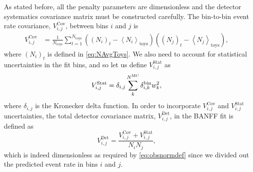 As stated before, all the penalty parameters are dimensionless and
the detector systematics covariance matrix must be constructed carefully.
The bin-to-bin event rate covariance, $V_{i,j}^{\text{Cov}}$, between
bins $i$ and $j$ is
\begin{equation}
\begin{aligned}V_{i,j}^{\text{Cov}} & =\frac{1}{N_{\text{toys}}}\sum_{t=1}^{N_{\text{toys}}}\left(\left(N_{i}\right)_{t}-\left\langle N_{i}\right\rangle _{\text{toys}}\right)\left(\left(N_{j}\right)_{t}-\left\langle N_{j}\right\rangle _{\text{toys}}\right),\end{aligned}
\label{eq:detector-cov-terms}
\end{equation}
where $\left(N_{i}\right)_{t}$ is defined in \eqref{eq:NAvgToys}.
We also need to account for statistical uncertainties in the fit bins,
and so let us define $V_{i,j}^{\text{Stat}}$ as
\begin{equation}
V_{i,j}^{\text{Stat}}=\text{\ensuremath{\delta_{i,j}}}\sum_{k}^{N^{\text{MC}}}\delta_{i,k}^{\text{bin}}w_{k}^{2},\label{eq:detector-stat-terms}
\end{equation}
where $\delta_{i,j}$ is the Kronecker delta function. In order to
incorporate $V_{i,j}^{\text{Cov}}$ and $V_{i,j}^{\text{Stat}}$ uncertainties,
the total detector covariance matrix, $V_{i,j}^{\text{Det}}$, in
the BANFF fit is defined as 
\begin{equation}
V_{i,j}^{\text{Det}}=\frac{V_{i,j}^{\text{Cov}}+V_{i,j}^{\text{Stat}}}{N_{i}N_{j}},\label{eq:totaldetectorcovariance}
\end{equation}
which is indeed dimensionless as required by \eqref{eq:obsnormdef}
since we divided out the predicted event rate in bins $i$ and $j$.

